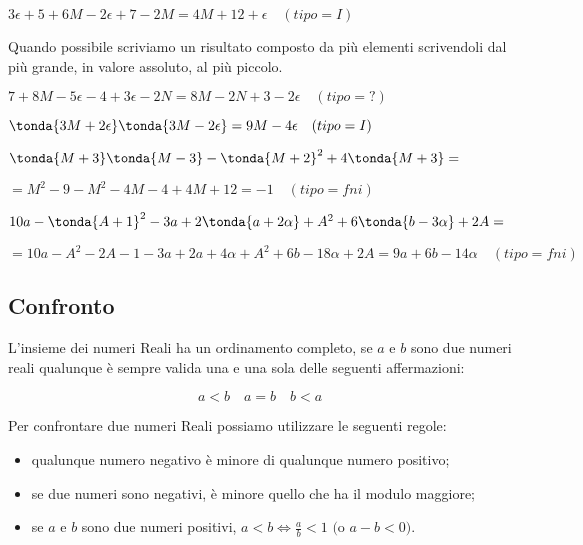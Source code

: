 \begin{exrig}
 \begin{esempio}
  $3\epsilon +5 +6M -2\epsilon +7 -2M = 4M +12 +\epsilon \quad (tipo=I)$
 \end{esempio}

\begin{osservazione}
 Quando possibile scriviamo un risultato composto da più elementi scrivendoli 
dal più grande, in valore assoluto, al più piccolo.
\end{osservazione}

 \begin{esempio}
$7 +8M -5\epsilon  -4 +3\epsilon-2N = 8M -2N +3 -2\epsilon 
\quad (tipo=?)$
 \end{esempio}
 
 \begin{esempio}
$\tonda{3M +2\epsilon} \tonda{3M -2\epsilon} = 9M -4\epsilon 
\quad (tipo=I)$
 \end{esempio}
 
 \begin{esempio}
$\tonda{M +3} \tonda{M -3} - \tonda{M+2}^2 +4\tonda{M +3}=$

$=M^2 -9 -M^2 -4M -4 +4M +12 = -1 
\quad (tipo=fni)$
 \end{esempio}
 
 \begin{esempio}
$10a -\tonda{A +1}^2 -3a +2\tonda{a+2\alpha} +A^2 +6\tonda{b -3\alpha} +2A= $

$=10a -A^2 -2A -1 -3a +2a+4\alpha +A^2 +6b -18\alpha +2A
= 9a +6b -14\alpha 
\quad (tipo=fni)$
 \end{esempio}
\end{exrig}

\subsection{Confronto}
\label{subsec:insnum_confronto}

L'insieme dei numeri Reali ha un ordinamento completo, se $a$ e $b$ sono due 
numeri reali qualunque è sempre valida una e una sola delle seguenti 
affermazioni:

\[a<b \quad a=b \quad b<a\]

Per confrontare due numeri Reali possiamo utilizzare le seguenti regole:

\begin{itemize}
 \item qualunque numero negativo è minore di qualunque numero positivo;
 \item se due numeri sono negativi, è minore quello che ha il modulo maggiore;
 \item se $a$ e $b$ sono due numeri positivi, 
 $a<b \Leftrightarrow \frac{a}{b}<1 \text{ (o } a-b<0 \text{)}$.
\end{itemize}

